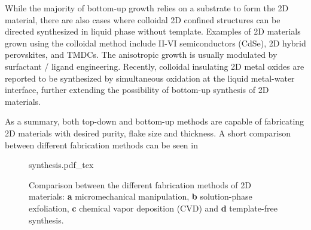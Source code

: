 While the majority of bottom-up growth relies on a substrate to form
the 2D material, there are also cases where colloidal 2D confined
structures can be directed synthesized in liquid phase without
template. Examples of 2D materials grown using the colloidal method
include II-VI semiconductors (CdSe), 2D hybrid perovskites, and
TMDCs. The anisotropic growth is usually modulated by surfactant /
ligand engineering. Recently, colloidal insulating 2D metal oxides are
reported to be synthesized by simultaneous oxidation at the liquid
metal-water interface, further extending the possibility of bottom-up
synthesis of 2D materials. 

As a summary, both top-down and bottom-up methods are capable of
fabricating 2D materials with desired purity, flake size and
thickness. A short comparison between different fabrication methods can be seen in 

\begin{figure}[h]
  \centering
  {synthesis.pdf_tex}
  \caption{\label{fig:intro-syn}%
    Comparison between the different fabrication methods of 2D
    materials: \textbf{a} micro\-mechanical manipulation, \textbf{b}
    solution-phase exfoliation, \textbf{c} chemical vapor deposition
    (CVD) and \textbf{d} template-free synthesis.%
  }
\end{figure}


